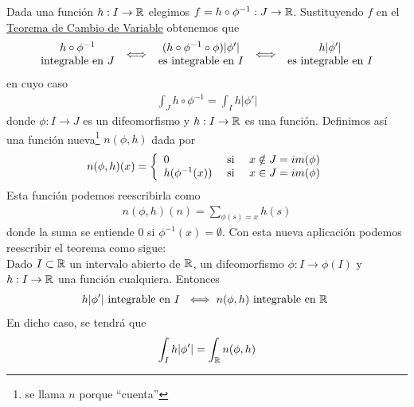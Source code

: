 Dada una función $h: I \to \mathbb{R}$ elegimos $f=h\circ \phi^{-1} : J \to \mathbb{R}$. Sustituyendo $f$ en el \hyperref[teo:cambio_variable]{Teorema de Cambio de Variable} obtenemos que 
\begin{gather*}
    \begin{array}{c}
        h\circ \phi^{-1} \\
        \text{integrable en $J$}
    \end{array} \iff
    \begin{array}{c}
        (h \circ \phi^{-1} \circ \phi)|\phi'|\\
        \text{es integrable en $I$}
    \end{array} \iff
    \begin{array}{c}
        h|\phi'|\\
        \text{es integrable en $I$}
    \end{array}
\end{gather*}
en cuyo caso 
\begin{gather*}
    \int_J h \circ \phi^{-1} = \int_I h|\phi'|
\end{gather*}
donde $\phi: I \to J$ es un difeomorfismo y $h:I \to \mathbb{R}$ es una función.
Definimos así una función nueva\footnote{se llama $n$ porque ``cuenta''} $n(\phi, h)$ dada por
\begin{gather*}
    n(\phi, h)(x) = \left\{
        \begin{array}{l c l}
            0 & \text{ si } & x\notin J = im(\phi)\\
            h(\phi^{-1}(x)) & \text{ si } & x\in J = im(\phi)
        \end{array}
    \right.
\end{gather*}
Esta función podemos reescribirla como 
\begin{gather*}
    n(\phi, h)(n) = \sum_{\phi(s)=x} h(s)
\end{gather*}
donde la suma se entiende $0$ si $\phi^{-1}(x)=\emptyset$. Con esta nueva aplicación podemos reescribir el teorema como sigue:\\

Dado $I \subset \mathbb{R}$ un intervalo abierto de $\mathbb{R}$, un difeomorfismo $\phi: I \to \phi(I)$ y $h:I \to \mathbb{R}$ una función cualquiera. Entonces 
\begin{gather*}
    h|\phi'| \text{ integrable en $I$ } \iff n(\phi, h) \text{ integrable en $\mathbb{R}$ }
\end{gather*}
En dicho caso, se tendrá que 
\begin{gather*}
    \int_I h|\phi'| = \int_{\mathbb{R}} n(\phi, h) 
\end{gather*}

